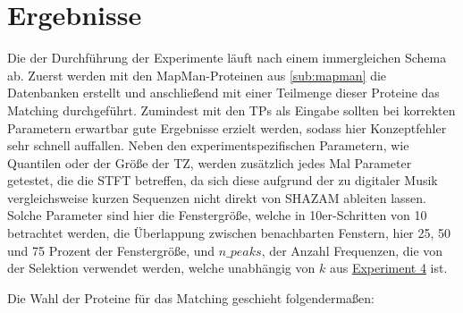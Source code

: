 \section{Ergebnisse} %
    \label{sec:ergebnisse}
    Die der Durchführung der Experimente läuft nach einem immergleichen Schema ab. Zuerst werden mit den MapMan-Proteinen aus \autoref{sub:mapman} die Datenbanken erstellt und anschließend mit einer Teilmenge dieser Proteine das Matching durchgeführt. Zumindest mit den \aclp{TP} als Eingabe sollten bei korrekten Parametern erwartbar gute Ergebnisse erzielt werden, sodass hier Konzeptfehler sehr schnell auffallen. Neben den experimentspezifischen Parametern, wie Quantilen oder der Größe der \acl{TZ}, werden zusätzlich jedes Mal Parameter getestet, die die \ac{STFT} betreffen, da sich diese aufgrund der zu digitaler Musik vergleichsweise kurzen Sequenzen nicht direkt von SHAZAM ableiten lassen. Solche Parameter sind hier die Fenstergröße, welche in 10er-Schritten von 10 betrachtet werden, die Überlappung zwischen benachbarten Fenstern, hier 25, 50 und 75 Prozent der Fenstergröße, und $n\_peaks$, der Anzahl Frequenzen, die von der Selektion verwendet werden, welche unabhängig von $k$ aus \hyperref[exp:selection_method]{Experiment 4} ist.

    Die Wahl der Proteine für das Matching geschieht folgendermaßen:

